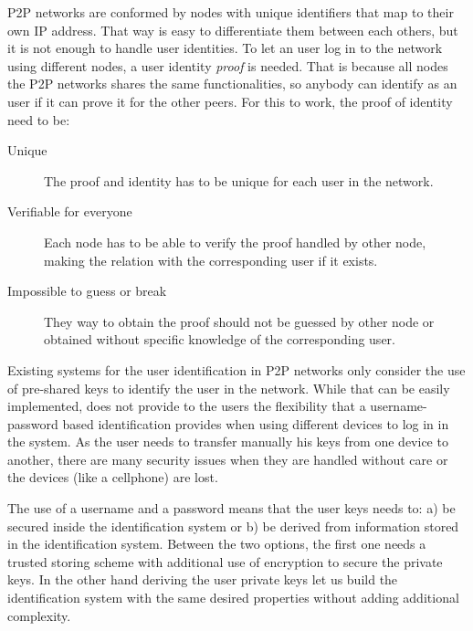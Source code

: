 P2P networks are conformed by nodes with unique identifiers that map to their
own IP address. That way is easy to differentiate them between each others, but
it is not enough to handle user identities. To let an user log in to the
network using different nodes, a user identity \textit{proof} is needed. That
is because all nodes the P2P networks shares the same functionalities, so
anybody can identify as an user if it can prove it for the other peers. For
this to work, the proof of identity need to be:
\begin{description}
  \item[Unique] The proof and identity has to be unique for each user in the network.

  \item[Verifiable for everyone]  Each node has to be able to verify the proof
    handled by other node, making the relation with the corresponding user if it
    exists.
  \item[Impossible to guess or break] They way to obtain the proof should not
    be guessed by other node or obtained without specific knowledge of the
    corresponding user.
\end{description}


Existing systems for the user identification in P2P networks only consider the
use of pre-shared keys to identify the user in the network. While that can
be easily implemented, does not provide to the users the flexibility that a
username-password based identification provides when using different devices to
log in in the system. As the user needs to transfer manually his keys from one
device to another, there are many security issues when they are handled without
care or the devices (like a cellphone) are lost. 

The use of a username and a password means that the user keys needs to: a) be
secured inside the identification system or b) be derived from information
stored in the identification system. Between  the two options, the first one
needs a trusted storing scheme with additional use of encryption to secure the
private keys. In the other hand deriving the user private keys let us build the
identification system with the same desired properties without adding
additional complexity.

